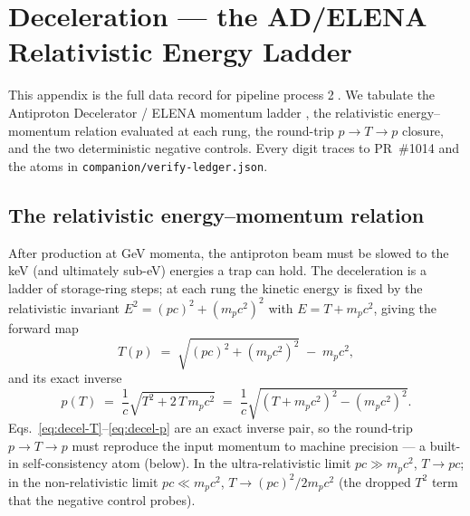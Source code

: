 \section{Deceleration --- the AD/ELENA Relativistic Energy Ladder}
\label{app:deceleration}

This appendix is the full data record for pipeline process
\textcircled{\scriptsize 2}. We tabulate the Antiproton Decelerator / ELENA
momentum ladder \citep{maury1997ad,maury2014elena}, the relativistic
energy--momentum relation evaluated at each rung, the round-trip
$p\!\to\!T\!\to\!p$ closure, and the two deterministic negative controls.
Every digit traces to PR~\#1014 and the atoms in
\texttt{companion/verify-ledger.json}.

\subsection{The relativistic energy--momentum relation}
\label{app:decel-rel}

After production at GeV momenta, the antiproton beam must be slowed to the
keV (and ultimately sub-eV) energies a trap can hold. The deceleration is a
ladder of storage-ring steps; at each rung the kinetic energy is fixed by the
relativistic invariant $E^2=(pc)^2+(m_pc^2)^2$ with $E=T+m_pc^2$, giving the
forward map
\begin{equation}
T(p) \;=\; \sqrt{(pc)^2 + (m_pc^2)^2}\;-\;m_pc^2 ,
\label{eq:decel-T}
\end{equation}
and its exact inverse
\begin{equation}
p(T) \;=\; \frac{1}{c}\sqrt{T^2 + 2\,T\,m_pc^2}
       \;=\; \frac{1}{c}\sqrt{(T+m_pc^2)^2-(m_pc^2)^2}.
\label{eq:decel-p}
\end{equation}
Eqs.~\eqref{eq:decel-T}--\eqref{eq:decel-p} are an exact inverse pair, so the
round-trip $p\to T\to p$ must reproduce the input momentum to machine
precision --- a built-in self-consistency atom (below). In the
ultra-relativistic limit $pc\gg m_pc^2$, $T\to pc$; in the non-relativistic
limit $pc\ll m_pc^2$, $T\to (pc)^2/2m_pc^2$ (the dropped $T^2$ term that the
negative control probes).


